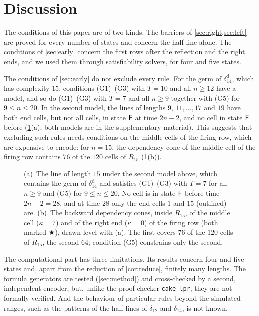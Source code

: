 \section{Discussion}\label{sec:discussion}

The conditions of this paper are of two kinds. The barriers of
\cref{sec:right,sec:left} are proved for every number of states and concern the
half-line alone. The conditions of \cref{sec:early} concern the first rows after
the reflection and the right ends, and we used them through satisfiability
solvers, for four and five states.

The conditions of \cref{sec:early} do not exclude every rule. For the germ of
$\delta_{14}^{\mathrm d}$, which has complexity $15$, conditions (G1)--(G3) with
$T=10$ and all $n\ge12$ have a model, and so do (G1)--(G3) with $T=7$ and all
$n\ge9$ together with (G5) for $9\le n\le20$. In the second model, the lines of
lengths $9$, $11,\dots,17$ and $19$ have both end cells, but not all cells, in
state $\mathsf F$ at time $2n-2$, and no cell in state $\mathsf F$ before
(\cref{fig:model}(a); both models are in the supplementary material). This suggests that excluding such rules needs
conditions on the middle cells of the firing row, which are expensive to
encode: for $n=15$, the dependency cone of the middle cell of the firing row
contains $76$ of the $120$ cells of $R_{15}$ (\cref{fig:model}(b)).

\begin{figure}[!htb]
\centering

\caption{(a)~The line of length $15$ under the second model above, which
contains the germ of $\delta_{14}^{\mathrm d}$ and satisfies (G1)--(G3) with
$T=7$ for all $n\ge9$ and (G5) for $9\le n\le20$. No cell is in state $\mathsf F$
before time $2n-2=28$, and at time $28$ only the end cells $1$ and $15$
(outlined) are. (b)~The backward dependency cones, inside $R_{15}$, of the
middle cell ($\kappa=7$) and of the right end ($\kappa=0$) of the firing row
(both marked $\bigstar$), drawn level with (a). The first covers $76$ of the
$120$ cells of $R_{15}$, the second $64$; condition (G5) constrains only the
second.}
\label{fig:model}
\end{figure}

The computational part has three limitations. Its results concern four and
five states and, apart from the reduction of \cref{cor:reduce}, finitely many
lengths. The formula generators are tested (\cref{sec:method}) and
cross-checked by a second, independent encoder, but, unlike the proof checker
\texttt{cake\_lpr}, they are not formally verified. And the behaviour of particular
rules beyond the simulated ranges, such as the patterns of the half-lines of
$\delta_{12}$ and $\delta_{14}$, is not known.

